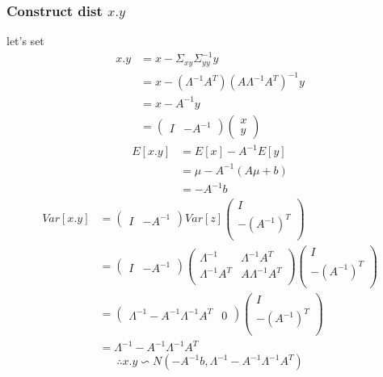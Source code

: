 \documentclass{report}
\begin{document}
\subsubsection{Construct dist $x.y$}
let's set 
$$
\begin{aligned}
x.y 
&= x - \Sigma_{xy} \Sigma_{yy}^{-1}y\\
&= x - (\Lambda^{-1} A^T)(A \Lambda^{-1}A^T)^{-1}y\\
&= x - A^{-1}y\\
&= 
\left ( \begin{matrix}
I& -A^{-1}
\end{matrix} \right )
\left ( \begin{matrix}
x\\
y
\end{matrix} \right )
\end{aligned}
$$
$$
\begin{aligned}
E[x.y] 
&= E[x] - A^{-1} E[y]\\
&= \mu - A^{-1}(A\mu+b)\\
&= -A^{-1}b
\end{aligned}
$$
$$
\begin{aligned}
Var[x.y]
&= 
\left ( \begin{matrix}
I& -A^{-1}
\end{matrix} \right )
Var[z]
\left ( \begin{matrix}
I\\
-(A^{-1})^T\\
\end{matrix} \right )\\
&= 
\left ( \begin{matrix}
I& -A^{-1}
\end{matrix} \right )
\left (
\begin{matrix}
\Lambda^{-1}&\Lambda^{-1}A^T\\
\Lambda^{-1}A^T&A\Lambda^{-1} A^T\\
\end{matrix}
\right )
\left ( \begin{matrix}
I\\
-(A^{-1})^T\\
\end{matrix} \right )\\
&=
\left ( \begin{matrix}
\Lambda^{-1}-A^{-1} \Lambda^{-1}A^T & 0
\end{matrix} \right )
\left ( \begin{matrix}
I\\
-(A^{-1})^T\\
\end{matrix} \right )\\
&=\Lambda^{-1}-A^{-1} \Lambda^{-1}A^T
\end{aligned}
$$
$$
\therefore x.y \backsim N(-A^{-1}b, \Lambda^{-1}-A^{-1} \Lambda^{-1}A^T)
$$
\end{document}
